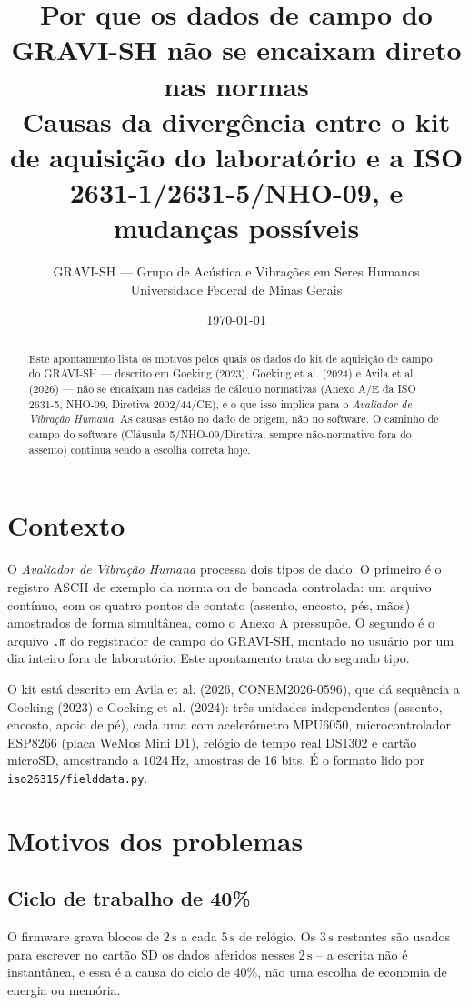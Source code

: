 \documentclass[11pt,a4paper]{article}
\title{\textbf{Por que os dados de campo do GRAVI-SH não se encaixam
direto nas normas}\\[0.3em]
\large Causas da divergência entre o kit de aquisição do laboratório e a
ISO 2631-1/2631-5/NHO-09, e mudanças possíveis}
\author{GRAVI-SH --- Grupo de Acústica e Vibrações em Seres Humanos\\
Universidade Federal de Minas Gerais}
\date{\today}
\newcommand{\code}[1]{\texttt{\small #1}}
\newcommand{\unit}[2]{\ensuremath{#1\,\mathrm{#2}}}
\begin{document}
\maketitle

\begin{abstract}
\noindent
Este apontamento lista os motivos pelos quais os dados do kit de aquisição
de campo do GRAVI-SH --- descrito em Goeking (2023), Goeking et al. (2024)
e Avila et al. (2026) --- não se encaixam nas cadeias de cálculo
normativas (Anexo A/E da ISO 2631-5, NHO-09, Diretiva 2002/44/CE), e o que
isso implica para o \emph{Avaliador de Vibração Humana}. As causas estão
no dado de origem, não no software. O caminho de campo do software
(Cláusula 5/NHO-09/Diretiva, sempre não-normativo fora do assento)
continua sendo a escolha correta hoje.
\end{abstract}

\section{Contexto}

O \emph{Avaliador de Vibração Humana} processa dois tipos de dado. O
primeiro é o registro ASCII de exemplo da norma ou de bancada controlada:
um arquivo contínuo, com os quatro pontos de contato (assento, encosto,
pés, mãos) amostrados de forma simultânea, como o Anexo A pressupõe. O
segundo é o arquivo \code{.m} do registrador de campo do GRAVI-SH, montado
no usuário por um dia inteiro fora de laboratório. Este apontamento trata
do segundo tipo.

O kit está descrito em Avila et al. (2026, CONEM2026-0596), que dá
sequência a Goeking (2023) e Goeking et al. (2024): três unidades
independentes (assento, encosto, apoio de pé), cada uma com acelerômetro
MPU6050, microcontrolador ESP8266 (placa WeMos Mini D1), relógio de tempo
real DS1302 e cartão microSD, amostrando a \unit{1024}{Hz}, amostras de 16
bits. É o formato lido por \code{iso26315/fielddata.py}.

\section{Motivos dos problemas}

\subsection{Ciclo de trabalho de 40\%}
\label{sec:duty}

O firmware grava blocos de \unit{2}{s} a cada \unit{5}{s} de relógio. Os
\unit{3}{s} restantes são usados para escrever no cartão SD os dados
aferidos nesses \unit{2}{s} -- a escrita não é instantânea, e essa é a
causa do ciclo de 40\%, não uma escolha de economia de energia ou memória.
\end{document}
